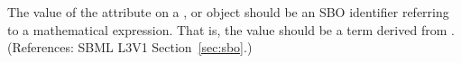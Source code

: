 The value of the attribute  on a \AlgebraicRule, \RateRule
or \AssignmentRule object should be an SBO identifier referring to a
mathematical expression.  That is, the value should be a term derived from
\sbomathformula.  (References: SBML L3V1 Section~\ref{sec:sbo}.)

